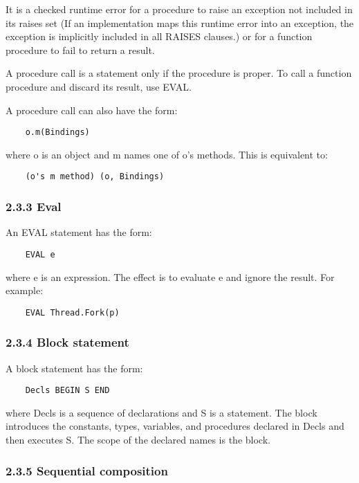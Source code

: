\documentclass[10pt]{article}
\begin{document}
 It is a checked runtime error for a procedure to raise an exception not included in its raises set (If an implementation maps this runtime error into an exception, the exception is implicitly included in all RAISES clauses.) or for a function procedure to fail to return a result. 


  A procedure call is a statement only if the procedure is proper. To call a function procedure and discard its result, use EVAL. 


 A procedure call can also have the form: 
\begin{verbatim}
    o.m(Bindings)
\end{verbatim}
 where o is an object and m names one of o's methods. This is equivalent to: 
\begin{verbatim}
    (o's m method) (o, Bindings)
\end{verbatim}



 
\subsubsection*{2.3.3 Eval}


  An EVAL statement has the form: 
\begin{verbatim}
    EVAL e
\end{verbatim}
 where e is an expression. The effect is to evaluate e and ignore the result. For example: 
\begin{verbatim}
    EVAL Thread.Fork(p)
\end{verbatim}



 
\subsubsection*{2.3.4 Block statement}


  A block statement has the form: 
\begin{verbatim}
    Decls BEGIN S END
\end{verbatim}
 where Decls is a sequence of declarations and S is a statement. The block introduces the constants, types, variables, and procedures declared in Decls and then executes S. The scope of the declared names is the block. 


 
\subsubsection*{2.3.5 Sequential composition}
\end{document}
